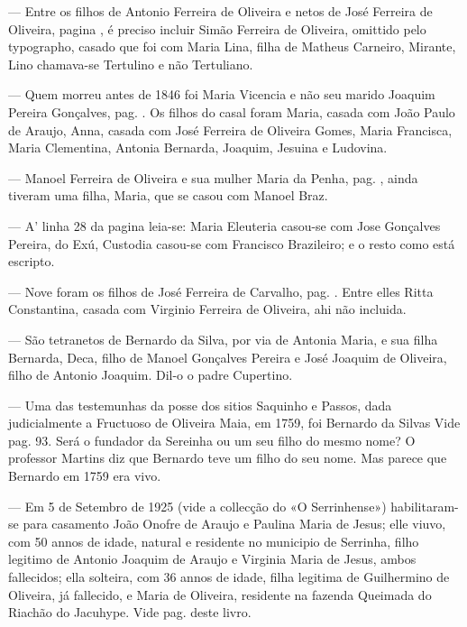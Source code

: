 — Entre os filhos de Antonio Ferreira de Oliveira e netos de José Ferreira de Oliveira, pagina \pageref{jfoliveira}, é preciso incluir Simão Ferreira de Oliveira, omittido pelo typographo, casado que foi com Maria Lina, filha de Matheus Carneiro, Mirante, Lino chamava-se Tertulino e não Tertuliano.

— Quem morreu antes de 1846 foi Maria Vicencia e não seu marido Joaquim Pereira Gonçalves, pag. \pageref{jpgoncalves}. Os filhos do casal foram Maria, casada com João Paulo de Araujo, Anna, casada com José Ferreira de Oliveira Gomes, Maria Francisca, Maria Clementina, Antonia Bernarda, Joaquim, Jesuina e Ludovina.

— Manoel Ferreira de Oliveira e sua mulher Maria da Penha, pag. \pageref{mpenha}, ainda tiveram uma filha, Maria, que se casou com Manoel Braz.

— A' linha 28 da pagina \pageref{maleuteria} leia-se: Maria Eleuteria casou-se com Jose Gonçalves Pereira, do Exú, Custodia casou-se com Francisco Brazileiro; e o resto como está escripto.

— Nove foram os filhos de José Ferreira de Carvalho, pag. \pageref{jfcarvalho}. Entre elles Ritta Constantina, casada com Virginio Ferreira de Oliveira, ahi não incluida.


— São tetranetos de Bernardo da Silva, por via de Antonia Maria, e sua filha Bernarda, Deca, filho de Manoel Gonçalves Pereira e José Joaquim de Oliveira, filho de Antonio Joaquim. Dil-o o padre Cupertino.




— Uma das testemunhas da posse dos sitios Saquinho e Passos, dada judicialmente a Fructuoso de Oliveira Maia, em 1759, foi Bernardo da Silvas Vide pag. 93. Será o fundador da Sereinha ou um seu filho do mesmo nome? O professor Martins diz que Bernardo teve um filho do seu nome. Mas parece que Bernardo em 1759 era vivo.

— Em 5 de Setembro de 1925 (vide a collecção do «O Serrinhense») habilitaram-se para casamento João Onofre de Araujo e Paulina Maria de Jesus; elle viuvo, com 50 annos de idade, natural e residente no municipio de Serrinha, filho legitimo de Antonio Joaquim de Araujo e Virginia Maria de Jesus, ambos fallecidos; ella solteira, com 36 annos de idade, filha legitima de Guilhermino de Oliveira, já fallecido, e
Maria de Oliveira, residente na fazenda Queimada do Riachão do Jacuhype. Vide pag. \pageref{ma18} deste livro.

